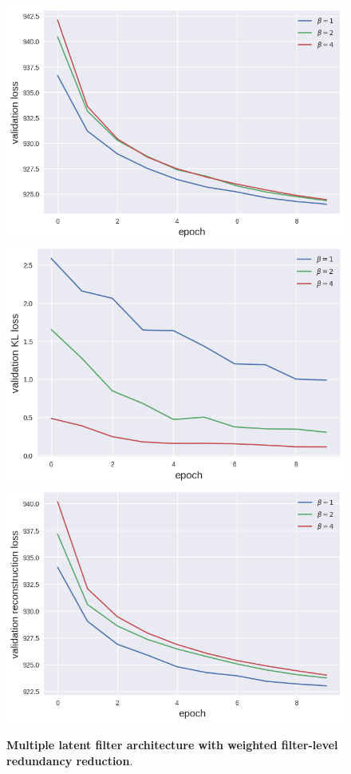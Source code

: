 \begin{figure}[h!]
\centering
\captionsetup{justification=centering}
    \includegraphics[scale=0.5]{figures/results/weighted_average/val_loss.png}
    \includegraphics[scale=0.5]{figures/results/weighted_average/val_kl_loss.png}
    \includegraphics[scale=0.5]{figures/results/weighted_average/val_reconstruction_loss.png}
\caption{\textbf{Multiple latent filter architecture with weighted filter-level redundancy reduction}.}
\label{fig:weighted_average_graphs}
\end{figure}




